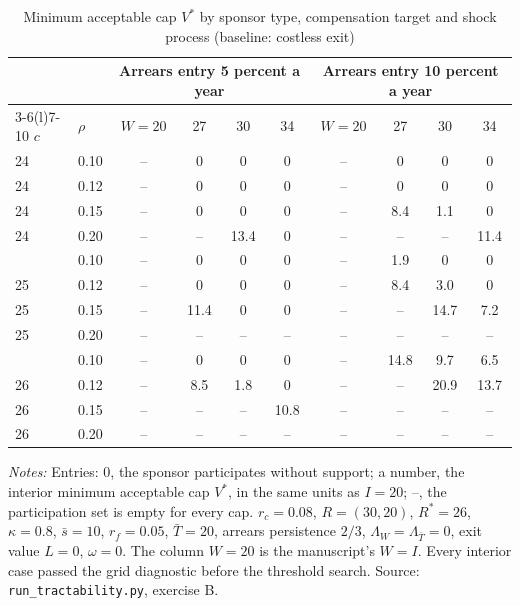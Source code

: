 \begin{table}[htbp]\centering\small
\caption{Minimum acceptable cap $V^*$ by sponsor type, compensation target and shock process (baseline: costless exit)}\label{tab:B}
\begin{threeparttable}\begin{tabular}{llcccccccc}\toprule
 & & \multicolumn{4}{c}{Arrears entry 5 percent a year} & \multicolumn{4}{c}{Arrears entry 10 percent a year}\\\cmidrule(lr){3-6}\cmidrule(l){7-10}
$c$ & $\rho$ & $W{=}20$ & 27 & 30 & 34 & $W{=}20$ & 27 & 30 & 34\\\midrule
24 & 0.10 & -- & 0 & 0 & 0 & -- & 0 & 0 & 0\\
24 & 0.12 & -- & 0 & 0 & 0 & -- & 0 & 0 & 0\\
24 & 0.15 & -- & 0 & 0 & 0 & -- & 8.4 & 1.1 & 0\\
24 & 0.20 & -- & -- & 13.4 & 0 & -- & -- & -- & 11.4\\
\addlinespace
25 & 0.10 & -- & 0 & 0 & 0 & -- & 1.9 & 0 & 0\\
25 & 0.12 & -- & 0 & 0 & 0 & -- & 8.4 & 3.0 & 0\\
25 & 0.15 & -- & 11.4 & 0 & 0 & -- & -- & 14.7 & 7.2\\
25 & 0.20 & -- & -- & -- & -- & -- & -- & -- & --\\
\addlinespace
26 & 0.10 & -- & 0 & 0 & 0 & -- & 14.8 & 9.7 & 6.5\\
26 & 0.12 & -- & 8.5 & 1.8 & 0 & -- & -- & 20.9 & 13.7\\
26 & 0.15 & -- & -- & -- & 10.8 & -- & -- & -- & --\\
26 & 0.20 & -- & -- & -- & -- & -- & -- & -- & --\\
\bottomrule\end{tabular}
\begin{tablenotes}\footnotesize\item \textit{Notes:} Entries: 0, the sponsor participates without support; a number, the interior minimum acceptable cap $V^*$, in the same units as $I = 20$; --, the participation set is empty for every cap. $r_c = 0.08$, $R = (30, 20)$, $R^* = 26$, $\kappa = 0.8$, $\bar s = 10$, $r_f = 0.05$, $\bar T = 20$, arrears persistence $2/3$, $\Lambda_W = \Lambda_{\bar T} = 0$, exit value $L = 0$, $\omega = 0$. The column $W = 20$ is the manuscript's $W = I$. Every interior case passed the grid diagnostic before the threshold search. Source: \texttt{run\_tractability.py}, exercise B.\end{tablenotes}
\end{threeparttable}\end{table}


